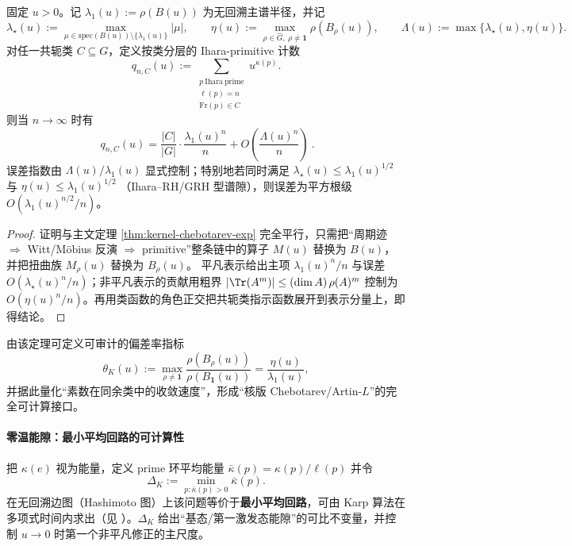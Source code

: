 \begin{theorem}\label{thm:ihara-chebotarev-exp}
固定 \(u>0\)。记 \(\lambda_1(u):=\rho(B(u))\) 为无回溯主谱半径，并记
\[
\lambda_\star(u):=\max_{\mu\in\mathrm{spec}(B(u))\setminus\{\lambda_1(u)\}}|\mu|,
\qquad
\eta(u):=\max_{\rho\in\widehat G,\ \rho\neq\mathbf 1}\rho(B_\rho(u)),
\qquad
\Lambda(u):=\max\{\lambda_\star(u),\eta(u)\}.
\]
对任一共轭类 \(C\subseteq G\)，定义按类分层的 Ihara-primitive 计数
\[
q_{n,C}(u):=\sum_{\substack{p\ \mathrm{Ihara\ prime}\\ \ell(p)=n\\ \mathrm{Fr}(p)\in C}}u^{\kappa(p)}.
\]
则当 \(n\to\infty\) 时有
\[
\boxed{\ 
q_{n,C}(u)=\frac{|C|}{|G|}\cdot\frac{\lambda_1(u)^n}{n}
+O\!\left(\frac{\Lambda(u)^n}{n}\right)\ }.
\]
误差指数由 \(\Lambda(u)/\lambda_1(u)\) 显式控制；特别地若同时满足
\(
\lambda_\star(u)\le \lambda_1(u)^{1/2}
\)
与
\(
\eta(u)\le \lambda_1(u)^{1/2}
\)
（Ihara--RH/GRH 型谱隙），则误差为平方根级
\(
O(\lambda_1(u)^{n/2}/n)
\)。
\end{theorem}

\begin{proof}
证明与主文定理 \ref{thm:kernel-chebotarev-exp} 完全平行，只需把“周期迹 \(\Rightarrow\) Witt/Möbius 反演 \(\Rightarrow\) primitive”整条链中的算子 \(M(u)\) 替换为 \(B(u)\)，并把扭曲族 \(M_\rho(u)\) 替换为 \(B_\rho(u)\)。
平凡表示给出主项 \(\lambda_1(u)^n/n\) 与误差 \(O(\lambda_\star(u)^n/n)\)；非平凡表示的贡献用粗界
\(
|\Tr(A^m)|\le (\dim A)\,\rho(A)^m
\)
控制为 \(O(\eta(u)^n/n)\)。再用类函数的角色正交把共轭类指示函数展开到表示分量上，即得结论。
\end{proof}

由该定理可定义可审计的偏差率指标
\[
\theta_K(u):=\max_{\rho\neq\mathbf 1}\frac{\rho(B_\rho(u))}{\rho(B_{\mathbf 1}(u))}
=\frac{\eta(u)}{\lambda_1(u)},
\]
并据此量化“素数在同余类中的收敛速度”，形成“核版 Chebotarev/Artin-\(L\)”的完全可计算接口。

\paragraph{零温能隙：最小平均回路的可计算性}
把 $\kappa(e)$ 视为能量，定义 prime 环平均能量
\(
\bar\kappa(p)=\kappa(p)/\ell(p)
\)
并令
\[
\Delta_K:=\min_{p:\bar\kappa(p)>0}\bar\kappa(p).
\]
在无回溯边图（Hashimoto 图）上该问题等价于\textbf{最小平均回路}，可由 Karp 算法在多项式时间内求出（见 \cite{Karp1978MinCycleMean}）。$\Delta_K$ 给出“基态/第一激发态能隙”的可比不变量，并控制 $u\to 0$ 时第一个非平凡修正的主尺度。

